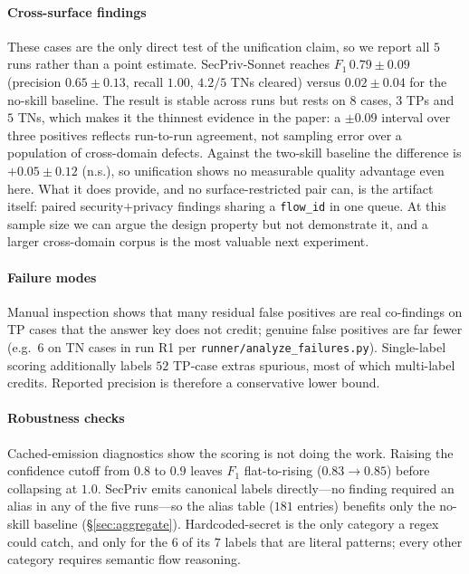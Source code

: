 \documentclass[runningheads]{llncs}
\begin{document}
\paragraph{Cross-surface findings}\label{sec:crosssurface} These cases are the only direct test of the unification claim, so we report all $5$ runs rather than a point estimate. SecPriv-Sonnet reaches $F_1\,0.79 \pm 0.09$ (precision $0.65 \pm 0.13$, recall $1.00$, $4.2/5$ TNs cleared) versus $0.02 \pm 0.04$ for the no-skill baseline. The result is stable across runs but rests on $8$ cases, $3$ TPs and $5$ TNs, which makes it the thinnest evidence in the paper: a $\pm 0.09$ interval over three positives reflects run-to-run agreement, not sampling error over a population of cross-domain defects. Against the two-skill baseline the difference is $+0.05 \pm 0.12$ (n.s.), so unification shows no measurable quality advantage even here. What it does provide, and no surface-restricted pair can, is the artifact itself: paired security$+$privacy findings sharing a \texttt{flow\_id} in one queue. At this sample size we can argue the design property but not demonstrate it, and a larger cross-domain corpus is the most valuable next experiment.

\paragraph{Failure modes}\label{sec:failure} Manual inspection shows that many residual false positives are real co-findings on TP cases that the answer key does not credit; genuine false positives are far fewer (e.g.\ $6$ on TN cases in run R1 per \texttt{runner/analyze\_failures.py}). Single-label scoring additionally labels $52$ TP-case extras spurious, most of which multi-label credits. Reported precision is therefore a conservative lower bound.

\paragraph{Robustness checks}\label{sec:robust} Cached-emission diagnostics show the scoring is not doing the work. Raising the confidence cutoff from $0.8$ to $0.9$ leaves $F_1$ flat-to-rising ($0.83\to0.85$) before collapsing at $1.0$. SecPriv emits canonical labels directly---no finding required an alias in any of the five runs---so the alias table ($181$ entries) benefits only the no-skill baseline (\S\ref{sec:aggregate}). Hardcoded-secret is the only category a regex could catch, and only for the $6$ of its $7$ labels that are literal patterns; every other category requires semantic flow reasoning.
\end{document}
